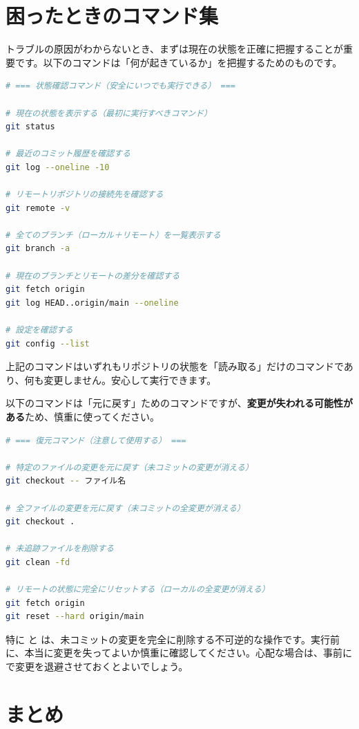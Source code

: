 \section{困ったときのコマンド集}

トラブルの原因がわからないとき、まずは現在の状態を正確に把握することが重要です。以下のコマンドは「何が起きているか」を把握するためのものです。

\begin{lstlisting}[language=bash]
# === 状態確認コマンド（安全にいつでも実行できる） ===

# 現在の状態を表示する（最初に実行すべきコマンド）
git status

# 最近のコミット履歴を確認する
git log --oneline -10

# リモートリポジトリの接続先を確認する
git remote -v

# 全てのブランチ（ローカル＋リモート）を一覧表示する
git branch -a

# 現在のブランチとリモートの差分を確認する
git fetch origin
git log HEAD..origin/main --oneline

# 設定を確認する
git config --list
\end{lstlisting}

上記のコマンドはいずれもリポジトリの状態を「読み取る」だけのコマンドであり、何も変更しません。安心して実行できます。

以下のコマンドは「元に戻す」ためのコマンドですが、\textbf{変更が失われる可能性がある}ため、慎重に使ってください。

\begin{lstlisting}[language=bash]
# === 復元コマンド（注意して使用する） ===

# 特定のファイルの変更を元に戻す（未コミットの変更が消える）
git checkout -- ファイル名

# 全ファイルの変更を元に戻す（未コミットの全変更が消える）
git checkout .

# 未追跡ファイルを削除する
git clean -fd

# リモートの状態に完全にリセットする（ローカルの全変更が消える）
git fetch origin
git reset --hard origin/main
\end{lstlisting}

特に  と  は、未コミットの変更を完全に削除する不可逆的な操作です。実行前に、本当に変更を失ってよいか慎重に確認してください。心配な場合は、事前に  で変更を退避させておくとよいでしょう。

\section{まとめ}

